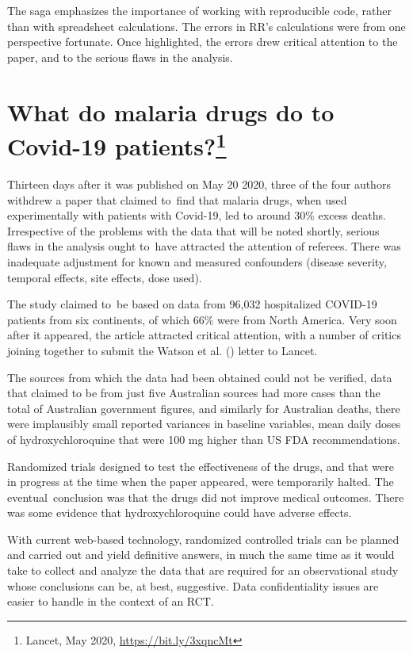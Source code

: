 \documentclass[
  10ptls,
  b5paper]{book}
\begin{document}
The saga emphasizes the importance of working with reproducible code, rather than with spreadsheet calculations. The errors in RR's calculations were from one perspective fortunate. Once highlighted, the errors drew critical attention to the paper, and to the serious flaws in the analysis.

\section[What do malaria drugs do to Covid-19 patients?]{\texorpdfstring{What do malaria drugs do to Covid-19 patients?\footnote{Lancet, May 2020, \url{https://bit.ly/3xqncMt}}}{What do malaria drugs do to Covid-19 patients?}}\label{sec:lancet}

Thirteen days after it was published on May 20 2020, three of the four authors withdrew a paper that claimed to~find that malaria drugs, when used experimentally with patients with Covid-19, led to around 30\% excess deaths. Irrespective of the problems with the data that will be noted shortly, serious flaws in the analysis ought to~have attracted the attention of referees. There was inadequate adjustment for known and measured confounders (disease severity, temporal effects, site effects, dose used).

The study claimed to~be based on data from 96,032 hospitalized COVID-19 patients from six continents, of which 66\% were from North America. Very soon after it appeared, the article attracted critical attention, with a number of critics joining together to submit the Watson et al. () letter to Lancet.

The sources from which the data had been obtained could not be verified, data that claimed to be from just five Australian sources had more cases than the total of Australian government figures, and similarly for Australian deaths, there were implausibly small reported variances in baseline variables, mean daily doses of hydroxychloroquine that were 100 mg higher than US FDA recommendations.

Randomized trials designed to test the effectiveness of the drugs, and that were in progress at the time when the paper appeared, were temporarily halted. The eventual~conclusion was that the drugs did not improve medical outcomes. There was some evidence that hydroxychloroquine could have adverse effects.

With current web-based technology, randomized controlled trials can be planned and carried out and yield definitive answers, in much the same time as it would take to collect and analyze the data that are required for an observational study whose conclusions can be, at best, suggestive. Data confidentiality issues are easier to handle in the context of an RCT.
\end{document}

